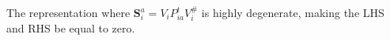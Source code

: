 \documentclass[11pt]{report}
\theoremstyle{definition}
\theoremstyle{remark}
\theoremstyle{remark}
\begin{document}
The representation where $\mathbf{S}_i^a = V_i P_{ia}^t V_i^\#$ is highly degenerate, making the LHS and RHS be equal to zero.

%
%
\end{document}
